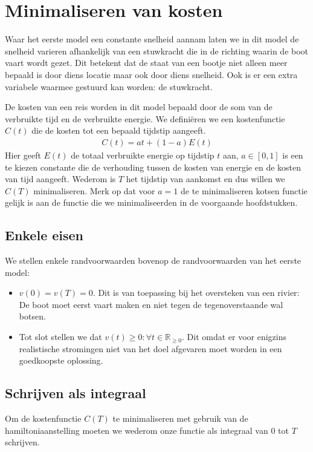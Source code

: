 \chapter{Minimaliseren van kosten}\label{sec:laagsteKosten}
Waar het eerste model een constante snelheid aannam laten we in dit model de snelheid varieren afhankelijk van een stuwkracht die in de richting waarin de boot vaart wordt gezet. Dit betekent dat de staat van een bootje niet alleen meer bepaald is door diens locatie maar ook door diens snelheid. Ook is er een extra variabele waarmee gestuurd kan worden: de stuwkracht.

De kosten van een reis worden in dit model bepaald door de som van de verbruikte tijd en de verbruikte energie. We defini\"eren we een kostenfunctie \(C(t)\) die de kosten tot een bepaald tijdstip aangeeft.
	\begin{align}
		C(t) = at +(1-a)E(t)
	\end{align}
Hier geeft \(E(t)\) de totaal verbruikte energie op tijdstip \(t\) aan, \(a\in[0,1]\) is een te kiezen constante die de verhouding tussen de kosten van energie en de kosten van tijd aangeeft. Wederom is \(T\) het tijdstip van aankomst en dus willen we \(C(T)\) minimaliseren. Merk op dat voor \(a = 1\) de te minimaliseren kotsen functie gelijk is aan de functie die we minimaliseerden in de voorgaande hoofdstukken.

\section{Enkele eisen}
We stellen enkele randvoorwaarden bovenop de randvoorwaarden van het eerste model:
\begin{itemize}
	\item[] \(v(0) = v(T) = 0\). Dit is van toepassing bij het oversteken van een rivier: De boot moet eerst vaart maken en niet tegen de tegenoverstaande wal botsen.
	\item[] Tot slot stellen we dat \(v(t) \geq 0:\forall t \in \mathbb{R}_{\geq 0}\). Dit omdat er voor enigzins realistische stromingen niet van het doel afgevaren moet worden in een goedkoopste oplossing.
\end{itemize}

\section{Schrijven als integraal}
Om de kostenfunctie \(C(T)\) te minimaliseren met gebruik van de hamiltoniaanstelling moeten we wederom onze functie als integraal van \(0\) tot \(T\) schrijven.


